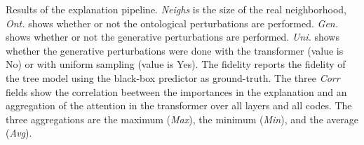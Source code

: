 \documentclass[]{marticle}
\begin{document}
\begin{table}[!tb]
\begin{center}
{    Results of the explanation pipeline. \textit{Neighs} is the size of the real neighborhood,
    \textit{Ont.} shows whether or not the ontological perturbations are performed. \textit{Gen.}
    shows whether or not the generative perturbations are performed. \textit{Uni.} shows whether the
    generative perturbations were done with the transformer (value is No) or with uniform sampling
    (value is Yes). The fidelity reports the fidelity of the tree model using the black-box
    predictor as ground-truth. The three \textit{Corr} fields show the correlation beetween the
    importances in the explanation and an aggregation of the attention in the transformer over all
    layers and all codes. The three aggregations are the maximum (\textit{Max}), the minimum
    (\textit{Min}), and the average (\textit{Avg}).
}
\label{tab:explainer-res-all}
\end{center}
\end{table}
\end{document}
